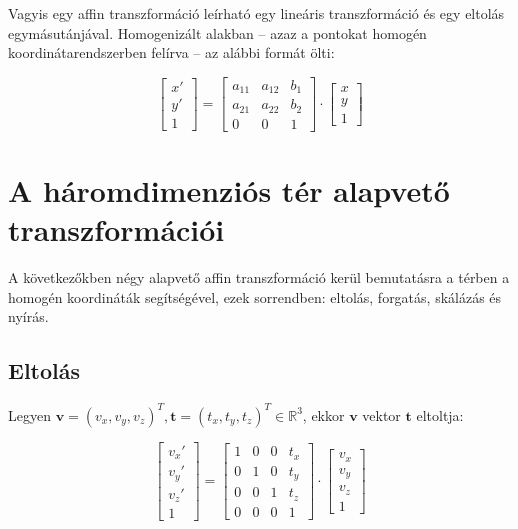 Vagyis egy affin transzformáció leírható egy lineáris transzformáció és egy eltolás egymásutánjával. Homogenizált alakban -- azaz a pontokat homogén koordinátarendszerben felírva -- az alábbi formát ölti:

\[\left[\begin{array}{c}x' \\y'\\ 1\end{array}\right] = \left[\begin{array}{ccc}a_{11} & a_{12} & b_1\\a_{21} & a_{22} & b_2\\0 & 0 & 1\end{array}\right] \cdot \left[\begin{array}{c}x \\ y\\ 1\end{array}\right]\]

\section{A háromdimenziós tér alapvető transzformációi}

A következőkben négy alapvető affin transzformáció kerül bemutatásra a térben a homogén koordináták segítségével, ezek sorrendben: eltolás, forgatás, skálázás és nyírás.

\subsection{Eltolás}

Legyen $\mathbf{v}=(v_x, v_y, v_z)^T, \mathbf{t}=(t_x, t_y, t_z)^T\in\mathbb{R}^3$, ekkor $\mathbf{v}$ vektor $\mathbf{t}$ eltoltja:

\[\left[\begin{array}{c}v_x' \\v_y'\\ v_z'\\ 1 \end{array}\right] = \left[\begin{array}{cccc}1 & 0 & 0 & t_x\\0 & 1 & 0 & t_y\\ 0 & 0 & 1 & t_z\\ 0 & 0 & 0 & 1\end{array}\right] \cdot \left[\begin{array}{c}v_x \\v_y\\ v_z\\ 1 \end{array}\right]\]

